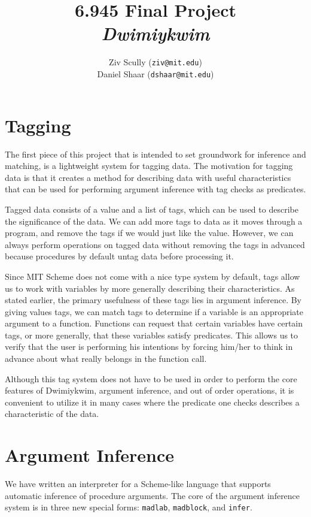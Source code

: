 \documentclass[11pt]{article}
\title{6.945 Final Project \\ \emph{Dwimiykwim}}
\author{Ziv Scully (\texttt{ziv@mit.edu}) \\
  Daniel Shaar (\texttt{dshaar@mit.edu})}
\date{}
\begin{document}
\maketitle


\section{Tagging}

The first piece of this project that is intended to set groundwork
for inference and matching, is a lightweight system for tagging data.
The motivation for tagging data is that it creates a method for
describing data with useful characteristics that can be used for
performing argument inference with tag checks as predicates.

Tagged data consists of a value and a list of tags,
which can be used to describe the significance of the data.
We can add more tags to data as it moves through a program,
and remove the tags if we would just like the value.
However, we can always perform operations on tagged data
without removing the tags in advanced because procedures by default
untag data before processing it.

Since MIT Scheme does not come with a nice type system by default,
tags allow us to work with variables by more generally describing their
characteristics. As stated earlier, the primary usefulness of these tags
lies in argument inference.
By giving values tags, we can match tags to determine if a variable
is an appropriate argument to a function.
Functions can request that certain variables have certain tags,
or more generally, that these variables satisfy predicates.
This allows us to verify that the user is performing his intentions
by forcing him/her to think in advance about what really belongs
in the function call.

Although this tag system does not have to be used in order to perform
the core features of Dwimiykwim, argument inference,
and out of order operations, it is convenient to utilize it
in many cases where the predicate one checks describes a characteristic
of the data.


\section{Argument Inference}

We have written an interpreter for a Scheme-like language
that supports automatic inference of procedure arguments.
The core of the argument inference system is in three new special forms:
\texttt{madlab}, \texttt{madblock}, and \texttt{infer}.
\end{document}

